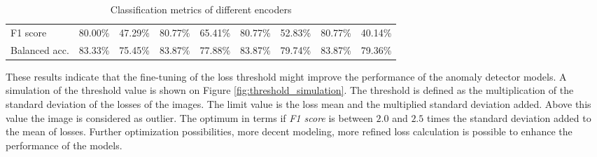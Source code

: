 \begin{table}[!ht]
\begin{tabular}{l | c c | c c | c c | c c}
        \hline
        F1 score        & 80.00\%                    & 47.29\%                       & 80.77\%                       & 65.41\%                             & 80.77\%  & 52.83\% & 80.77\%  & 40.14\% \\
        Balanced acc.   & 83.33\%                    & 75.45\%                       & 83.87\%                       & 77.88\%                             & 83.87\%  & 79.74\% & 83.87\%  & 79.36\% \\
    \end{tabular}
    \caption{Classification metrics of different encoders}
    \label{table:classification_metrics}
\end{table}

These results indicate that the fine-tuning of the loss threshold might improve the performance
of the anomaly detector models.
A simulation of the threshold value is shown on Figure \ref{fig:threshold_simulation}.
The threshold is defined as the multiplication of the standard deviation of the losses of the images.
The limit value is the loss mean and the multiplied standard deviation added.
Above this value the image is considered as outlier.
The optimum in terms if \emph{F1 score} is between $2.0$ and $2.5$ times the standard deviation added
to the mean of losses.
Further optimization possibilities, more decent modeling, more refined loss calculation is possible
to enhance the performance of the models.

